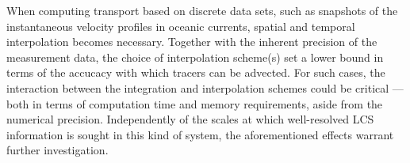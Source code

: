 When computing transport based on discrete data sets, such as snapshots of the
instantaneous velocity profiles in oceanic currents, spatial and temporal
interpolation becomes necessary. Together with the inherent precision of the
measurement data, the choice of interpolation scheme(s) set a lower bound
in terms of the accucacy with which tracers can be advected. For such cases,
the interaction between the integration and interpolation schemes could
be critical --- both in terms of computation time and memory requirements,
aside from the numerical precision. Independently of the scales at which
well-resolved LCS information is sought in this kind of system, the
aforementioned effects warrant further investigation.

